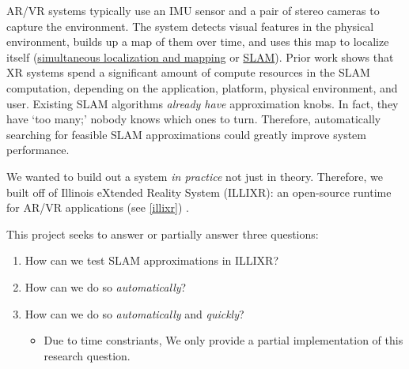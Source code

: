 AR/VR systems typically use an IMU sensor and a pair of stereo cameras to capture the environment. The system detects visual features in the physical environment, builds up a map of them over time, and uses this map to localize itself (\ul{simultaneous localization and mapping} or \ul{SLAM}). Prior work shows that XR systems spend a significant amount of compute resources in the SLAM computation, depending on the application, platform, physical environment, and user\cite{huzaifa2020exploring}. Existing SLAM algorithms \textit{already have} approximation knobs. In fact, they have `too many;' nobody knows which ones to turn. Therefore, automatically searching for feasible SLAM approximations could greatly improve system performance.


We wanted to build out a system \textit{in practice} not just in theory. Therefore, we built off of Illinois eXtended Reality System (ILLIXR): an open-source runtime for AR/VR applications (see \cref{illixr}) \cite{huzaifa2020exploring}.

This project seeks to answer or partially answer three questions:

\begin{enumerate}[label={\textbf{R.Q. {\theenumi}}}]
\item How can we test SLAM approximations in ILLIXR?
\item How can we do so \textit{automatically}?
\item How can we do so \textit{automatically} and \textit{quickly}?
  \begin{itemize}
  \item Due to time constriants, We only provide a partial implementation of this research question.
  \end{itemize}
\end{enumerate}

